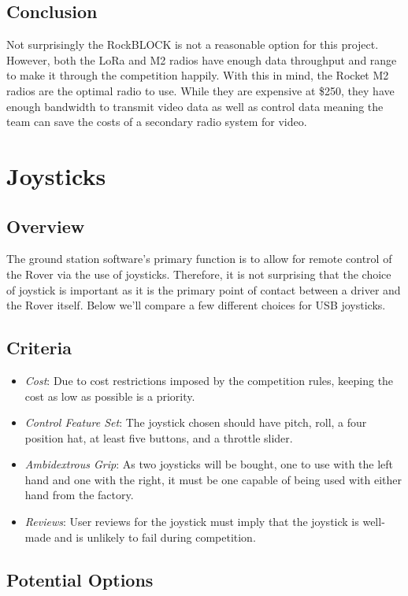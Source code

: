 \documentclass[onecolumn, draftclsnofoot, 10pt, compsoc]{IEEEtran}
\begin{document}
\subsection{Conclusion}
Not surprisingly the RockBLOCK is not a reasonable option for this project. However, both the LoRa and M2 radios have enough data throughput and range to make it through the competition happily. With this in mind, the Rocket M2 radios are the optimal radio to use. While they are expensive at \$250, they have enough bandwidth to transmit video data as well as control data meaning the team can save the costs of a secondary radio system for video.

\section{Joysticks}
\subsection{Overview}
The ground station software's primary function is to allow for remote control of the Rover via the use of joysticks. Therefore, it is not surprising that the choice of joystick is important as it is the primary point of contact between a driver and the Rover itself. Below we'll compare a few different choices for USB joysticks.

\subsection{Criteria}
\begin{itemize}
\item \textit{Cost}: Due to cost restrictions imposed by the competition rules, keeping the cost as low as possible is a priority.
\item \textit{Control Feature Set}: The joystick chosen should have pitch, roll, a four position hat, at least five buttons, and a throttle slider.
\item \textit{Ambidextrous Grip}: As two joysticks will be bought, one to use with the left hand and one with the right, it must be one capable of being used with either hand from the factory.
\item \textit{Reviews}: User reviews for the joystick must imply that the joystick is well-made and is unlikely to fail during competition.
\end{itemize}

\subsection{Potential Options}
\end{document}
